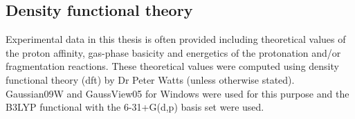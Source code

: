 \subsection{Density functional theory}
Experimental data in this thesis is often provided including theoretical values of the proton affinity, gas-phase basicity and energetics of the protonation and/or fragmentation reactions.
These theoretical values were computed using density functional theory (\acrshort{dft}) by Dr Peter Watts (unless otherwise stated). 
Gaussian09W and GaussView05 for Windows were used for this purpose \cite{frisch2009gaussian} and the B3LYP functional with the 6-31+G(d,p) basis set were used.





